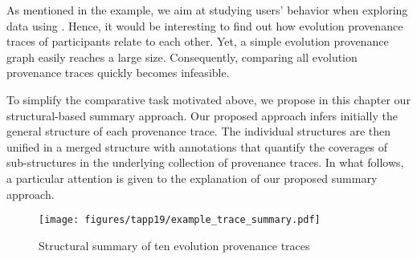 As mentioned in the example, we aim at studying users' behavior when exploring data using \prototype{}.
Hence, it would be interesting to find out how evolution provenance traces of participants relate to each other. 
Yet, a simple evolution provenance graph easily reaches a large size. 
Consequently, comparing all evolution provenance traces quickly becomes infeasible.




To simplify the comparative task motivated above, we propose in this chapter our structural-based summary approach.
Our proposed approach infers initially the general structure of each provenance trace. The individual structures are then unified in a merged structure with annotations that quantify the coverages of sub-structures in the underlying collection of provenance traces. In what follows, a particular attention is given to the explanation of our proposed summary approach.

\begin{figure}[b]
\texttt{[image: figures/tapp19/example\_trace\_summary.pdf]}
\caption{Structural summary of ten evolution provenance traces}
\label{fig:Inf-type-university}
\end{figure}

